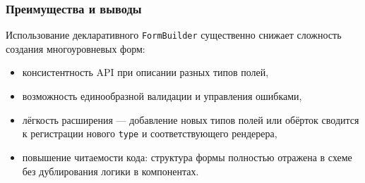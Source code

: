 \subsubsection{Преимущества и выводы}
Использование декларативного \texttt{FormBuilder} существенно снижает сложность создания многоуровневых форм:
\begin{itemize}
  \item консистентность API при описании разных типов полей,
  \item возможность единообразной валидации и управления ошибками,
  \item лёгкость расширения — добавление новых типов полей или обёрток сводится к регистрации нового \texttt{type} и соответствующего рендерера,
  \item повышение читаемости кода: структура формы полностью отражена в схеме без дублирования логики в компонентах.
\end{itemize}

